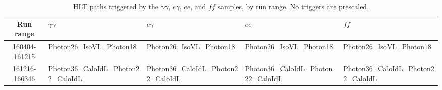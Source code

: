 \documentclass[dissertation.tex]{subfiles}
\begin{document}
\begin{table}[hcbp]
\caption{HLT paths triggered by the $\gamma\gamma\mbox{, }e\gamma\mbox{, }ee\mbox{, and }\mathit{ff}$ samples, by run range.  No triggers are prescaled.}
\centering
\begin{tabular}{|c|m{2.6cm}|m{2.6cm}|m{2.6cm}|m{2.6cm}|}
\hline
Run range & $\gamma\gamma$ & $e\gamma$ & $ee$ & $\mathit{ff}$ \\
\hline
\hline
160404-161215 & Photon26\_\newline IsoVL\_\newline Photon18 & Photon26\_\newline IsoVL\_\newline Photon18 & Photon26\_\newline IsoVL\_\newline Photon18 & Photon26\_\newline IsoVL\_\newline Photon18 \\
\hline
161216-166346 & Photon36\_\newline CaloIdL\_\newline Photon22\_\newline CaloIdL &  Photon36\_\newline CaloIdL\_\newline Photon22\_\newline CaloIdL &  Photon36\_\newline CaloIdL\_\newline Photon22\_\newline CaloIdL &  Photon36\_\newline CaloIdL\_\newline Photon22\_\newline CaloIdL \\
\hline

\end{tabular}
\end{table}
\end{document}
